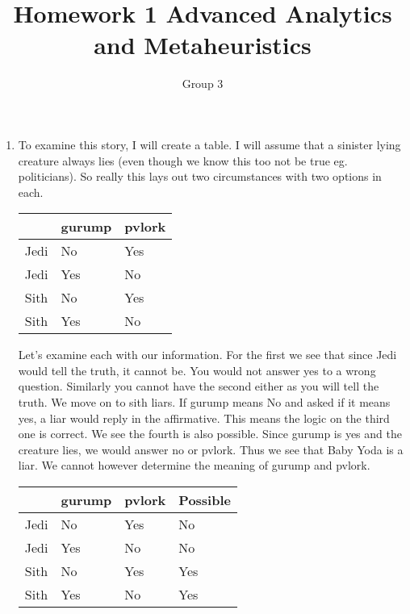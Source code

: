 \documentclass[11pt]{article}
\author{Group 3}
\title{Homework 1 Advanced Analytics and Metaheuristics}
\begin{document}
\maketitle
%
\begin{enumerate}
\item To examine this story, I will create a table.  I will assume that a sinister lying creature always lies (even though we know this too not be true eg. politicians).  So really this lays out two circumstances with two options in each.  

\begin{tabular}{l|l|l}
&gurump&pvlork\\ \hline
Jedi&No& Yes\\
Jedi& Yes&No\\
Sith &No & Yes\\
Sith & Yes &No

\end{tabular}

Let's examine each with our information.  For the first we see that since Jedi would tell the truth, it cannot be.  You would not answer yes to a wrong question.  Similarly you cannot have the second either as you will tell the truth.  We move on to sith liars.  If gurump means No and asked if it means yes, a liar would reply in the affirmative.  This means the logic on the third one is correct.  We see the fourth is also possible.  Since gurump is yes and the creature lies, we would answer no or pvlork.  Thus we see that Baby Yoda is a liar.  We cannot however determine the meaning of gurump and pvlork.

\begin{tabular}{l|l|l|l}
&gurump&pvlork&Possible\\ \hline
Jedi&No& Yes& No\\
Jedi& Yes&No& No\\
Sith &No & Yes& Yes\\
Sith & Yes &No&Yes


\end{tabular}
\end{enumerate}
\end{document}
